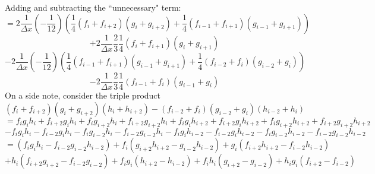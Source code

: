 \documentclass[12pt]{article}
\numberwithin{equation}{section}
\numberwithin{figure}{section}
\begin{document}
Adding and subtracting the ``unnecessary" term:
\begin{equation*}
= 2\frac{1}{\Delta x}\left(-\frac{1}{12}\right)
\left(\frac{1}{4}\left(f_{i} + f_{i+2}\right)\left(g_{i} + g_{i+2}\right) + \frac{1}{4}\left(f_{i-1} + f_{i+1}\right)\left(g_{i-1} + g_{i+1}\right)\right)
\end{equation*}
\begin{equation*}
+2\frac{1}{\Delta x}\frac{2}{3}\frac{1}{4}\left(f_{i} + f_{i+1}\right)\left(g_{i} + g_{i+1}\right)
\end{equation*}
\begin{equation*}
-2\frac{1}{\Delta x}\left(-\frac{1}{12}\right)\left(\frac{1}{4}\left(f_{i-1} + f_{i+1}\right)\left(g_{i-1} + g_{i+1}\right) + \frac{1}{4}\left(f_{i-2} + f_{i}\right)\left(g_{i-2} + g_{i}\right)\right)
\end{equation*}
\begin{equation*}
-2\frac{1}{\Delta x}\frac{2}{3}\frac{1}{4}\left(f_{i-1} + f_{i}\right)\left(g_{i-1} + g_{i}\right)
\end{equation*}
On a side note, consider the triple product
\begin{equation*}
(f_{i} + f_{i+2})(g_{i} + g_{i+2})(h_{i} + h_{i+2}) - (f_{i-2} + f_{i})(g_{i-2} + g_{i})(h_{i-2} + h_{i})
\end{equation*}
\begin{equation*}
= f_{i}g_{i}h_{i}     + f_{i+2}g_{i}h_{i}
+ f_{i}g_{i+2}h_{i}   + f_{i+2}g_{i+2}h_{i}
+ f_{i}g_{i}h_{i+2}   + f_{i+2}g_{i}h_{i+2}
+ f_{i}g_{i+2}h_{i+2} + f_{i+2}g_{i+2}h_{i+2}
\end{equation*}
\begin{equation*}
- f_{i}g_{i}h_{i}     - f_{i-2}g_{i}h_{i}
- f_{i}g_{i-2}h_{i}   - f_{i-2}g_{i-2}h_{i}
- f_{i}g_{i}h_{i-2}   - f_{i-2}g_{i}h_{i-2}
- f_{i}g_{i-2}h_{i-2} - f_{i-2}g_{i-2}h_{i-2}
\end{equation*}
\begin{equation*}
= (f_{i}g_{i}h_{i} - f_{i-2}g_{i-2}h_{i-2}) + f_{i}(g_{i+2}h_{i+2} - g_{i-2}h_{i-2}) + g_{i}(f_{i+2}h_{i+2} - f_{i-2}h_{i-2})
\end{equation*}
\begin{equation}
+ h_{i}(f_{i+2}g_{i+2} - f_{i-2}g_{i-2}) + f_{i}g_{i}(h_{i+2} - h_{i-2}) + f_{i}h_{i}(g_{i+2} - g_{i-2}) + h_{i}g_{i}(f_{i+2} - f_{i-2})
\end{equation}
\end{document}
